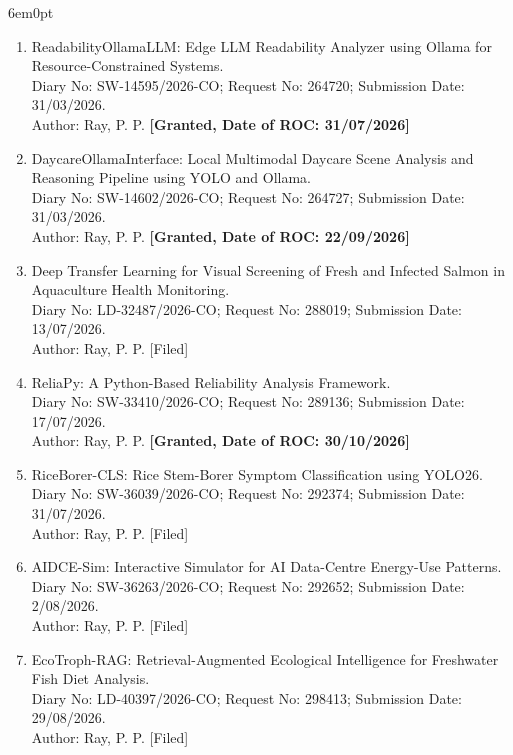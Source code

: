 \documentclass[11pt,a4paper]{moderncv}
\begin{document}
\begin{adjustwidth}{6em}{0pt}
\begin{enumerate}
		\item ReadabilityOllamaLLM: Edge LLM Readability Analyzer using Ollama for Resource-Constrained Systems. \\
		Diary No: SW-14595/2026-CO; Request No: 264720; Submission Date: 31/03/2026. \\
		Author: Ray, P. P. \textbf{[Granted, Date of ROC: 31/07/2026]}
		
		\item DaycareOllamaInterface: Local Multimodal Daycare Scene Analysis and Reasoning Pipeline using YOLO and Ollama. \\
		Diary No: SW-14602/2026-CO; Request No: 264727; Submission Date: 31/03/2026. \\
		Author: Ray, P. P. \textbf{[Granted, Date of ROC: 22/09/2026]}
		
		\item Deep Transfer Learning for Visual Screening of Fresh and Infected Salmon in Aquaculture Health Monitoring. \\
		Diary No: LD-32487/2026-CO; Request No: 288019; Submission Date: 13/07/2026. \\
		Author: Ray, P. P. [Filed]
		
		
		\item ReliaPy: A Python-Based Reliability Analysis Framework. \\
		Diary No: SW-33410/2026-CO; Request No: 289136; Submission Date: 17/07/2026. \\
		Author: Ray, P. P. \textbf{[Granted, Date of ROC: 30/10/2026]}
		
		\item RiceBorer-CLS: Rice Stem-Borer Symptom Classification using YOLO26. \\
		Diary No: SW-36039/2026-CO; Request No: 292374; Submission Date: 31/07/2026. \\
		Author: Ray, P. P. [Filed]

		\item AIDCE-Sim: Interactive Simulator for AI Data-Centre Energy-Use Patterns. \\
		Diary No: SW-36263/2026-CO; Request No: 292652; Submission Date: 2/08/2026. \\
		Author: Ray, P. P. [Filed]

		\item EcoTroph-RAG: Retrieval-Augmented Ecological Intelligence for
		Freshwater Fish Diet Analysis. \\
		Diary No: LD-40397/2026-CO; Request No: 298413; Submission Date: 29/08/2026. \\
		Author: Ray, P. P. [Filed]



\end{enumerate}
\end{adjustwidth}
\end{document}

